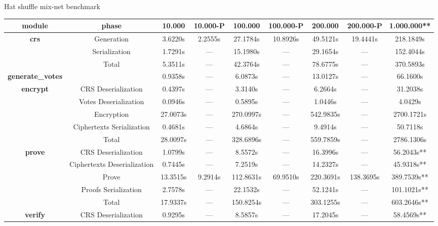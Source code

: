 \documentclass{standalone}
\begin{document}
\begin{threeparttable}
\caption{Hat shuffle mix-net benchmark}
\label{table:hatshuffle}
\begin{tabular}{c|c|ccccccc}
\hline
    \textbf{module} & \textbf{phase} & \textbf{10.000} & \textbf{10.000-P} & \textbf{100.000} & \textbf{100.000-P} & \textbf{200.000} & \textbf{200.000-P} & \textbf{1.000.000}** \\
\hline
\hline
    \multirow{2}{*}{\textbf{crs}} & Generation & 3.6220s & 2.2555s & 27.1784s & 10.8926s & 49.5121s & 19.4441s & 218.1849s \\
    & Serialization & 1.7291s & --- & 15.1980s & --- & 29.1654s& --- & 152.4044s \\
\hline
    & Total & 5.3511s & --- & 42.3764s & --- & 78.6775s& --- & 370.5893s \\
\hline
\hline
    \textbf{generate\_votes} & & 0.9358s & --- & 6.0873s & --- & 13.0127s & --- & 66.1600s \\
\hline
\hline
    \multirow{4}{*}{\textbf{encrypt}} & CRS Deserialization & 0.4397s & --- & 3.3140s & --- & 6.2664s & --- & 31.2038s \\
    & Votes Deserialization & 0.0946s & --- & 0.5895s & --- & 1.0446s & --- & 4.0429s \\
    & Encryption & 27.0073s & --- & 270.0997s & --- & 542.9835s & --- & 2700.1721s \\
    & Ciphertexts Serialization & 0.4681s & --- & 4.6864s & --- & 9.4914s & --- & 50.7118s \\
\hline
    & Total & 28.0097s & --- & 328.6896s & --- & 559.7859s & --- & 2786.1306s \\
\hline
\hline
    \multirow{4}{*}{\textbf{prove}} & CRS Deserialization & 1.0799s & --- & 8.5572s & --- & 16.3996s & --- & 56.2043s** \\
    & Ciphertexts Deserialization & 0.7445s & --- & 7.2519s & --- & 14.2327s & --- & 45.9318s** \\
    & Prove & 13.3515s & 9.2914s & 112.8631s & 69.9510s & 220.3691s & 138.3695s & 389.7539s** \\
    & Proofs Serialization & 2.7578s & --- & 22.1532s & --- & 52.1241s & --- & 101.1021s** \\
\hline
    & Total & 17.9337s & --- & 150.8254s & --- & 303.1255s & --- & 603.2646s** \\
\hline
\hline
    \multirow{4}{*}{\textbf{verify}} & CRS Deserialization & 0.9295s & --- & 8.5857s & --- & 17.2045s & --- & 58.4569s** \\

\end{tabular}
\end{threeparttable}
\end{document}
